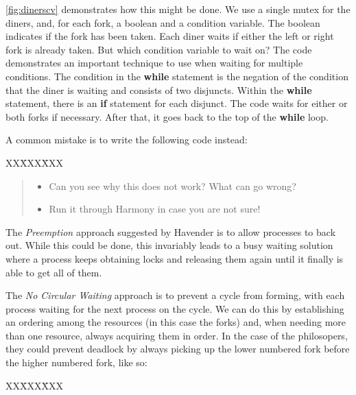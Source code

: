\documentclass{report}
\newcommand{\harmonysource}[1]{
\begin{tabbing}
XX\=XXX\=XXX\kill
    
\end{tabbing}
}
\newenvironment{code}{
\tcolorbox
}{
\endtcolorbox
}
\begin{document}
\autoref{fig:dinerscv} demonstrates how this might be done.
We use a single mutex for the diners, and, for each fork, a boolean
and a condition variable.  The boolean indicates if the fork has been
taken.
Each diner waits if either the left or right fork is already taken.
But which condition variable to wait on?
The code demonstrates an important technique to use when waiting for
multiple conditions.
%
The condition in the \textbf{while} statement is the negation of the
condition that the diner is waiting and consists of two disjuncts.
Within the \textbf{while} statement,
there is an \textbf{if} statement for each disjunct.
The code waits for either or both forks if necessary.  After that, it goes
back to the top of the \textbf{while} loop.

A common mistake is to write the following code instead:

\begin{code}
\harmonysource{baddblwait}
\end{code}

\begin{quote}
\begin{itemize}
\item Can you see why this does not work?  What can go wrong?
\item Run it through Harmony in case you are not sure!
\end{itemize}
\end{quote}

The \emph{Preemption} approach suggested by Havender is to allow processes to back out.
While this could be done, this invariably leads to a busy waiting solution
where a process keeps obtaining locks and releasing them again until it
finally is able to get all of them.

The \emph{No Circular Waiting} approach
is to prevent a cycle from forming, with each
process waiting for the next process on the cycle.
We can do this by establishing an ordering among the
resources (in this case the forks) and, when needing more than one
resource, always acquiring them in order.  In the case of the philosopers,
they could prevent deadlock by always picking up the lower numbered fork
before the higher numbered fork, like so:

\vspace{1em}
\begin{code}
\harmonysource{dinersfix}
\end{code}
\vspace{1em}
\end{document}
